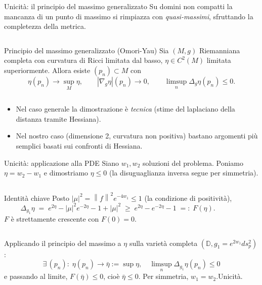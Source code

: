 \documentclass[aspectratio=169,11pt]{beamer}
\newcommand{\D}{\mathbb{D}}
\newcommand{\norm}[1]{\left\lVert #1 \right\rVert}
\begin{document}
\begin{frame}[t]{Unicità: il principio del massimo generalizzato}
  Su domini non compatti la mancanza di un punto di massimo si rimpiazza
  con \emph{quasi-massimi}, sfruttando la completezza della metrica.

  \vspace{2mm}
  \begin{columns}[T,onlytextwidth]
    \hfill
    \begin{block}{Principio del massimo generalizzato (Omori-Yau)}
      Sia $(M,g)$ Riemanniana completa con curvatura di Ricci limitata
      dal basso, $\eta\in C^2(M)$ limitata superiormente. Allora
      esiste $(p_n)\subset M$ con
      \[
        \eta(p_n)\to\sup_M\eta,
        \qquad
        |\nabla_g\eta|(p_n)\to 0,
        \qquad
        \limsup_n \Delta_g\eta(p_n)\le 0.
      \]
    \end{block}
    \hfill
  \end{columns}

  \vspace{2mm}
  \begin{itemize}\itemsep=2pt
    \item Nel caso generale la dimostrazione è \emph{tecnica} (stime
          del laplaciano della distanza tramite Hessiana).
    \item Nel nostro caso (\alert{dimensione 2}, curvatura non
          positiva) bastano argomenti più semplici basati sui
          confronti di Hessiana.
  \end{itemize}
\end{frame}


\begin{frame}[t]{Unicità: applicazione alla PDE}
  Siano $w_1,w_2$ soluzioni del problema. Poniamo $\eta = w_2-w_1$ e
  dimostriamo $\eta\le 0$ (la disuguaglianza inversa segue per simmetria).

  \vspace{2mm}
  \begin{columns}[T,onlytextwidth]
    \hfill
    \begin{block}{Identità chiave}
      Posto $|\mu|^2=\norm{f}^2 e^{-4 w_1}\le 1$
      (la condizione di positività),
      \[
        \Delta_{g_1}\eta
        \;=\; e^{2\eta}-|\mu|^2 e^{-2\eta}-1+|\mu|^2
        \;\ge\; e^{2\eta}-e^{-2\eta}-1
        \;=:\; F(\eta).
      \]
      $F$ è strettamente crescente con $F(0)=0$.
    \end{block}
    \hfill
  \end{columns}

  \vspace{2mm}
  Applicando il principio del massimo a $\eta$ sulla varietà completa
  $(\D,g_1=e^{2w_1}ds_p^2)$:
  \[
    \exists\,(p_n):\;
    \eta(p_n)\to\bar\eta:=\sup\eta,\quad
    \limsup_n\Delta_{g_1}\eta(p_n)\le 0
  \]
  e passando al limite, $F(\bar\eta)\le 0$, cioè $\bar\eta\le 0$.
  Per simmetria, $w_1=w_2$.\quad\alert{Unicità.}
\end{frame}
\end{document}
